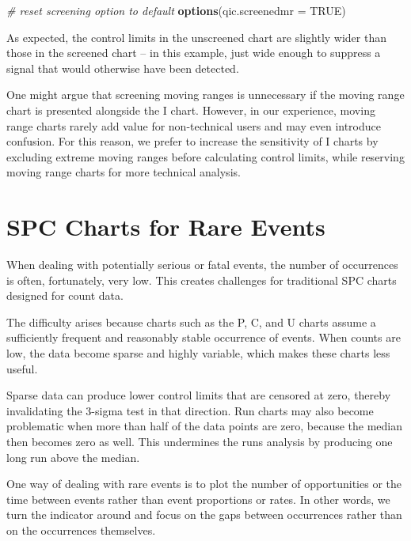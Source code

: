 \documentclass[
]{book}
\newenvironment{Shaded}{\begin{snugshade}}{\end{snugshade}}
\newcommand{\AttributeTok}[1]{\textcolor[rgb]{0.13,0.29,0.53}{#1}}
\newcommand{\CommentTok}[1]{\textcolor[rgb]{0.56,0.35,0.01}{\textit{#1}}}
\newcommand{\ConstantTok}[1]{\textcolor[rgb]{0.56,0.35,0.01}{#1}}
\newcommand{\FunctionTok}[1]{\textcolor[rgb]{0.13,0.29,0.53}{\textbf{#1}}}
\newcommand{\NormalTok}[1]{#1}
\begin{document}
\begin{Shaded}
\begin{Highlighting}[]
\CommentTok{\# reset screening option to default}
\FunctionTok{options}\NormalTok{(}\AttributeTok{qic.screenedmr =} \ConstantTok{TRUE}\NormalTok{)}
\end{Highlighting}
\end{Shaded}

As expected, the control limits in the unscreened chart are slightly wider than those in the screened chart -- in this example, just wide enough to suppress a signal that would otherwise have been detected.

One might argue that screening moving ranges is unnecessary if the moving range chart is presented alongside the I chart. However, in our experience, moving range charts rarely add value for non-technical users and may even introduce confusion. For this reason, we prefer to increase the sensitivity of I charts by excluding extreme moving ranges before calculating control limits, while reserving moving range charts for more technical analysis.

\chapter{SPC Charts for Rare Events}\label{spc-charts-for-rare-events}

When dealing with potentially serious or fatal events, the number of occurrences is often, fortunately, very low. This creates challenges for traditional SPC charts designed for count data.

The difficulty arises because charts such as the P, C, and U charts assume a sufficiently frequent and reasonably stable occurrence of events. When counts are low, the data become sparse and highly variable, which makes these charts less useful.

Sparse data can produce lower control limits that are censored at zero, thereby invalidating the 3-sigma test in that direction. Run charts may also become problematic when more than half of the data points are zero, because the median then becomes zero as well. This undermines the runs analysis by producing one long run above the median.

One way of dealing with rare events is to plot the number of opportunities or the time between events rather than event proportions or rates. In other words, we turn the indicator around and focus on the gaps between occurrences rather than on the occurrences themselves.
\end{document}
